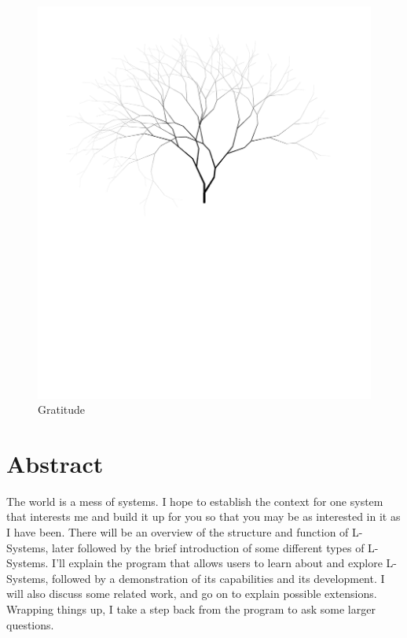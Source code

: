 \documentclass[12pt,twoside]{reedthesis}
\begin{document}
	\begin{figure}[h]
	\centering
	\includegraphics[clip=true, viewport=1in 5.5in 9in 11.3in, scale=0.49]{Images/Acknowledgements1}
	\caption[Gratitude]{Gratitude\footnotemark}
	\label {Acknowledgements1}
	\end{figure}
	


    \tableofcontents
	\listoffigures

\chapter*{Abstract}
	The world is a mess of systems. I hope to establish the context for one system that interests me and build it up for you so that you may be as interested in it as I have been. There will be an overview of the structure and function of L-Systems, later followed by the brief introduction of some different types of L-Systems. I'll explain the program that allows users to learn about and explore L-Systems, followed by a demonstration of its capabilities and its development. I will also discuss some related work, and go on to explain possible extensions. Wrapping things up, I take a step back from the program to ask some larger questions.
	
\end{document}
